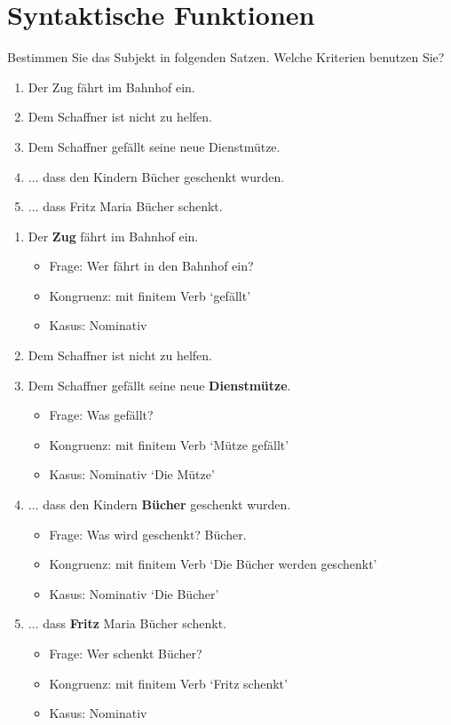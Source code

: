 \section{Syntaktische Funktionen}
Bestimmen Sie das Subjekt in folgenden Satzen. Welche Kriterien benutzen Sie?
\begin{enumerate}
  \item Der Zug fährt im Bahnhof ein.
  \item Dem Schaffner ist nicht zu helfen.
  \item Dem Schaffner gefällt seine neue Dienstmütze.
  \item ... dass den Kindern Bücher geschenkt wurden.
  \item ... dass Fritz Maria Bücher schenkt.
\end{enumerate}

\begin{enumerate}
  \item Der \textbf{Zug} fährt im Bahnhof ein. \begin{itemize}
  	\item Frage: Wer fährt in den Bahnhof ein?
  	\item Kongruenz: mit finitem Verb `gefällt'
  	\item Kasus: Nominativ
  \end{itemize}

  \item Dem Schaffner ist nicht zu helfen.
  \item Dem Schaffner gefällt seine neue \textbf{Dienstmütze}. \begin{itemize}
  	\item Frage: Was gefällt?
  	\item Kongruenz: mit finitem Verb `Mütze gefällt'
  	\item Kasus: Nominativ `Die Mütze'
  \end{itemize}
  \item ... dass den Kindern \textbf{Bücher} geschenkt wurden. \begin{itemize}
  	\item Frage: Was wird geschenkt? Bücher.
  	\item Kongruenz: mit finitem Verb `Die Bücher werden geschenkt'
  	\item Kasus: Nominativ `Die Bücher'
  \end{itemize}
  \item ... dass \textbf{Fritz} Maria Bücher schenkt. \begin{itemize}
  	\item Frage: Wer schenkt Bücher?
  	\item Kongruenz: mit finitem Verb `Fritz schenkt'
  	\item Kasus: Nominativ
  \end{itemize}
\end{enumerate}